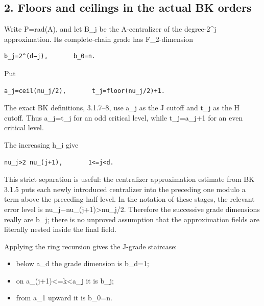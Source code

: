 \hypertarget{dyadic_capacity-floors-and-ceilings-in-the-actual-bk-orders}{%
\subsection{2. Floors and ceilings in the actual BK
orders}\label{dyadic_capacity-floors-and-ceilings-in-the-actual-bk-orders}}

Write P=rad(A), and let B\_j be the A-centralizer of the degree-2\^{}j
approximation. Its complete-chain grade has F\_2-dimension

\begin{Verbatim}[fontsize=\small,breaklines=true,breakanywhere=true]
b_j=2^(d−j),       b_0=n.
\end{Verbatim}

Put

\begin{Verbatim}[fontsize=\small,breaklines=true,breakanywhere=true]
a_j=ceil(nu_j/2),       t_j=floor(nu_j/2)+1.
\end{Verbatim}

The exact BK definitions, 3.1.7--8, use a\_j as the J cutoff and t\_j as
the H cutoff. Thus a\_j=t\_j for an odd critical level, while
t\_j=a\_j+1 for an even critical level.

The increasing h\_i give

\begin{Verbatim}[fontsize=\small,breaklines=true,breakanywhere=true]
nu_j>2 nu_(j+1),       1<=j<d.
\end{Verbatim}

This strict separation is useful: the centralizer approximation estimate
from BK 3.1.5 puts each newly introduced centralizer into the preceding
one modulo a term above the preceding half-level. In the notation of
these stages, the relevant error level is
nu\_j−nu\_(j+1)\textgreater nu\_j/2. Therefore the successive grade
dimensions really are b\_j; there is no unproved assumption that the
approximation fields are literally nested inside the final field.

Applying the ring recursion gives the J-grade staircase:

\begin{itemize}
\tightlist
\item
  below a\_d the grade dimension is b\_d=1;
\item
  on a\_(j+1)\textless=k\textless a\_j it is b\_j;
\item
  from a\_1 upward it is b\_0=n.
\end{itemize}

